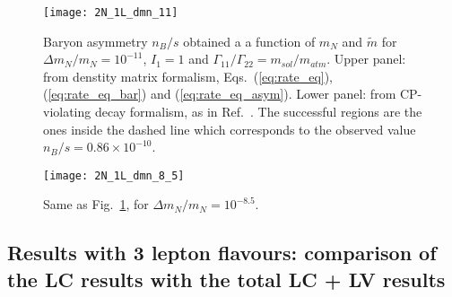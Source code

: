 \documentclass[prd,twocolumn,superscriptaddress,preprintnumbers,nofootinbib,
noshowpacs,groupedaddress]{revtex4-1} %
\begin{document}








\begin{figure}
\texttt{[image: 2N\_1L\_dmn\_11]}
\caption{Baryon asymmetry $n_B/s$ obtained a a function of $m_N$ and $\tilde{m}$ for $\Delta m_N/m_N=10^{-11}$, $I_1=1$  and 
$\Gamma_{11}/\Gamma_{22}=m_{sol}/m_{atm}$. Upper panel: from denstity matrix formalism, Eqs.~(\ref{eq:rate_eq}), (\ref{eq:rate_eq_bar}) and (\ref{eq:rate_eq_asym}). Lower panel: from CP-violating decay formalism, as in Ref.~\cite{Hambye:2016sby}. The successful regions are the ones inside the dashed line which corresponds to the observed value $n_B/s=0.86 \times 10^{-10}$.}
\label{fig:2N_1L_dmn_11}
\end{figure}

\begin{figure}
\texttt{[image: 2N\_1L\_dmn\_8\_5]}
\caption{Same as Fig.~\ref{fig:2N_1L_dmn_11}, for $\Delta m_N/m_N=10^{-8.5}$.}
\label{fig:2N_1L_dmn_8_5}
\end{figure}

\subsection{Results with 3 lepton flavours: comparison of the LC results with the total LC + LV results}\label{sec:comparison}
\end{document}
